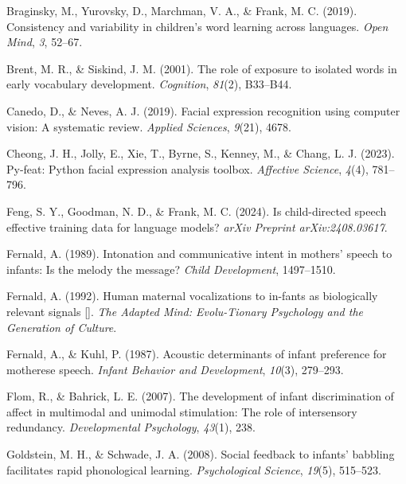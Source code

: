\documentclass[10pt, letterpaper]{article}
\begin{document}
\begin{CSLReferences}{1}{0}
Braginsky, M., Yurovsky, D., Marchman, V. A., \& Frank, M. C. (2019).
Consistency and variability in children's word learning across
languages. \emph{Open Mind}, \emph{3}, 52--67.

Brent, M. R., \& Siskind, J. M. (2001). The role of exposure to isolated
words in early vocabulary development. \emph{Cognition}, \emph{81}(2),
B33--B44.

Canedo, D., \& Neves, A. J. (2019). Facial expression recognition using
computer vision: A systematic review. \emph{Applied Sciences},
\emph{9}(21), 4678.

Cheong, J. H., Jolly, E., Xie, T., Byrne, S., Kenney, M., \& Chang, L.
J. (2023). Py-feat: Python facial expression analysis toolbox.
\emph{Affective Science}, \emph{4}(4), 781--796.

Feng, S. Y., Goodman, N. D., \& Frank, M. C. (2024). Is child-directed
speech effective training data for language models? \emph{arXiv Preprint
arXiv:2408.03617}.

Fernald, A. (1989). Intonation and communicative intent in mothers'
speech to infants: Is the melody the message? \emph{Child Development},
1497--1510.

Fernald, A. (1992). Human maternal vocalizations to in-fants as
biologically relevant signals {[}{]}. \emph{The Adapted Mind:
Evolu-Tionary Psychology and the Generation of Culture}.

Fernald, A., \& Kuhl, P. (1987). Acoustic determinants of infant
preference for motherese speech. \emph{Infant Behavior and Development},
\emph{10}(3), 279--293.

Flom, R., \& Bahrick, L. E. (2007). The development of infant
discrimination of affect in multimodal and unimodal stimulation: The
role of intersensory redundancy. \emph{Developmental Psychology},
\emph{43}(1), 238.

Goldstein, M. H., \& Schwade, J. A. (2008). Social feedback to infants'
babbling facilitates rapid phonological learning. \emph{Psychological
Science}, \emph{19}(5), 515--523.


\end{CSLReferences}
\end{document}

